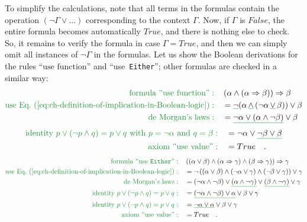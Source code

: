 To simplify the calculations, note that all terms in the formulas
contain the operation $\left(\neg\Gamma\vee...\right)$ corresponding
to the context $\Gamma$. Now, if $\Gamma$ is $False$, the entire
formula becomes automatically $True$, and there is nothing else to
check. So, it remains to verify the formula in case $\Gamma=True$,
and then we can simply omit all instances of $\neg\Gamma$ in the
formulas. Let us show the Boolean derivations for the rules \textsf{``}$\text{use function}$\textsf{''}
and \textsf{``}use~\lstinline!Either!\textsf{''}; other formulas are checked in
a similar way:
\begin{align*}
{\color{greenunder}\text{formula \textsf{``}use function\textsf{''}}:}\quad & \left(\alpha\wedge\left(\alpha\Rightarrow\beta\right)\right)\Rightarrow\beta\\
{\color{greenunder}\text{use Eq.~(\ref{eq:ch-definition-of-implication-in-Boolean-logic})}:}\quad & =\gunderline{\neg}(\alpha\,\gunderline{\wedge}\,(\neg\alpha\,\gunderline{\vee}\,\beta))\vee\beta\\
{\color{greenunder}\text{de Morgan\textsf{'}s laws}:}\quad & =\gunderline{\neg\alpha\vee(\alpha\wedge\neg\beta)}\vee\beta
\end{align*}
\begin{align*}
{\color{greenunder}\text{identity }p\vee(\neg p\wedge q)=p\vee q\text{ with }p=\neg\alpha\text{ and }q=\beta:}\quad & =\neg\alpha\vee\gunderline{\neg\beta\vee\beta}\\
{\color{greenunder}\text{axiom \textsf{``}use value\textsf{''}}:}\quad & =True\quad.
\end{align*}
\begin{align*}
{\color{greenunder}\text{formula \textsf{``}use \texttt{Either}\textsf{''}}:}\quad & \left(\left(\alpha\vee\beta\right)\wedge\left(\alpha\Rightarrow\gamma\right)\wedge\left(\beta\Rightarrow\gamma\right)\right)\Rightarrow\gamma\\
{\color{greenunder}\text{use Eq.~(\ref{eq:ch-definition-of-implication-in-Boolean-logic})}:}\quad & =\neg\left(\left(\alpha\vee\beta\right)\wedge\left(\neg\alpha\vee\gamma\right)\wedge\left(\neg\beta\vee\gamma\right)\right)\vee\gamma\\
{\color{greenunder}\text{de Morgan\textsf{'}s laws}:}\quad & =\left(\neg\alpha\wedge\neg\beta\right)\vee\gunderline{\left(\alpha\wedge\neg\gamma\right)}\vee\gunderline{\left(\beta\wedge\neg\gamma\right)}\vee\gamma\\
{\color{greenunder}\text{identity }p\vee(\neg p\wedge q)=p\vee q:}\quad & =\gunderline{\left(\neg\alpha\wedge\neg\beta\right)\vee\alpha}\vee\beta\vee\gamma\\
{\color{greenunder}\text{identity }p\vee(\neg p\wedge q)=p\vee q:}\quad & =\gunderline{\neg\alpha\vee\alpha}\vee\beta\vee\gamma\\
{\color{greenunder}\text{axiom \textsf{``}use value\textsf{''}}:}\quad & =True\quad.
\end{align*}
